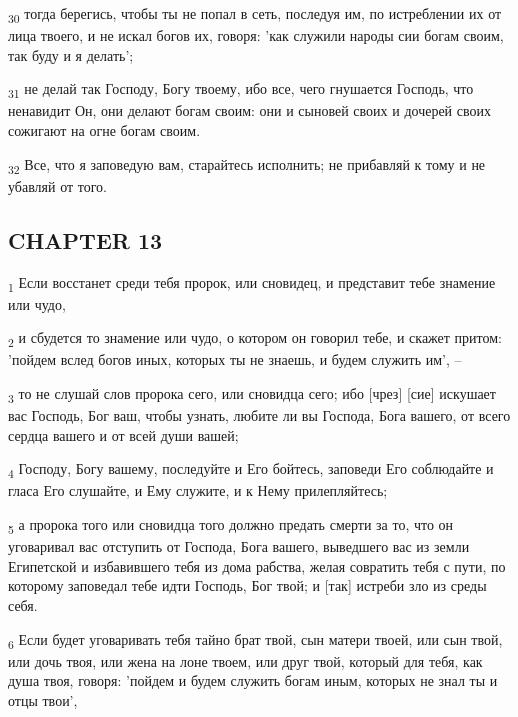 \begin{tcolorbox}
\textsubscript{30} тогда берегись, чтобы ты не попал в сеть, последуя им, по истреблении их от лица твоего, и не искал богов их, говоря: 'как служили народы сии богам своим, так буду и я делать';
\end{tcolorbox}
\begin{tcolorbox}
\textsubscript{31} не делай так Господу, Богу твоему, ибо все, чего гнушается Господь, что ненавидит Он, они делают богам своим: они и сыновей своих и дочерей своих сожигают на огне богам своим.
\end{tcolorbox}
\begin{tcolorbox}
\textsubscript{32} Все, что я заповедую вам, старайтесь исполнить; не прибавляй к тому и не убавляй от того.
\end{tcolorbox}
\subsection{CHAPTER 13}
\begin{tcolorbox}
\textsubscript{1} Если восстанет среди тебя пророк, или сновидец, и представит тебе знамение или чудо,
\end{tcolorbox}
\begin{tcolorbox}
\textsubscript{2} и сбудется то знамение или чудо, о котором он говорил тебе, и скажет притом: 'пойдем вслед богов иных, которых ты не знаешь, и будем служить им', --
\end{tcolorbox}
\begin{tcolorbox}
\textsubscript{3} то не слушай слов пророка сего, или сновидца сего; ибо [чрез] [сие] искушает вас Господь, Бог ваш, чтобы узнать, любите ли вы Господа, Бога вашего, от всего сердца вашего и от всей души вашей;
\end{tcolorbox}
\begin{tcolorbox}
\textsubscript{4} Господу, Богу вашему, последуйте и Его бойтесь, заповеди Его соблюдайте и гласа Его слушайте, и Ему служите, и к Нему прилепляйтесь;
\end{tcolorbox}
\begin{tcolorbox}
\textsubscript{5} а пророка того или сновидца того должно предать смерти за то, что он уговаривал вас отступить от Господа, Бога вашего, выведшего вас из земли Египетской и избавившего тебя из дома рабства, желая совратить тебя с пути, по которому заповедал тебе идти Господь, Бог твой; и [так] истреби зло из среды себя.
\end{tcolorbox}
\begin{tcolorbox}
\textsubscript{6} Если будет уговаривать тебя тайно брат твой, сын матери твоей, или сын твой, или дочь твоя, или жена на лоне твоем, или друг твой, который для тебя, как душа твоя, говоря: 'пойдем и будем служить богам иным, которых не знал ты и отцы твои',
\end{tcolorbox}
